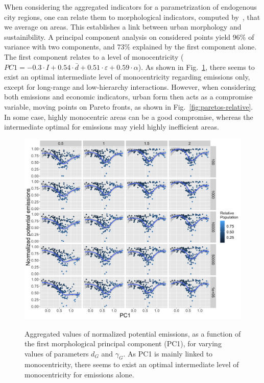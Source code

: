 \documentclass{jimis-en}
\begin{document}
When considering the aggregated indicators for a parametrization of endogenous city regions, one can relate them to morphological indicators, computed by~\cite{}, that we average on areas. This establishes a link between urban morphology and sustainibility. A principal component analysis on considered points yield 96\% of variance with two components, and 73\% explained by the first component alone. The first component relates to a level of monocentricity ($PC1 = -0.3\cdot I + 0.54 \cdot \bar{d} + 0.51\cdot \varepsilon + 0.59 \cdot \alpha$). As shown in Fig.~\ref{fig:emissions-pc1}, there seems to exist an optimal intermediate level of monocentricity regarding emissions only, except for long-range and low-hierarchy interactions. However, when considering both emissions and economic indicators, urban form then acts as a compromise variable, moving points on Pareto fronts, as shown in Fig.~\ref{fig:paretos-relative}. In some case, highly monocentric areas can be a good compromise, whereas the intermediate optimal for emissions may yield highly inefficient areas.



\begin{figure}[ht] 
  {\includegraphics[width=\linewidth]{figures/aggreg_morpho_pc1-emissions.png}}
  \centering
  \label{fig:emissions-pc1}
  \caption{Aggregated values of normalized potential emissions, as a function of the first morphological principal component (PC1), for varying values of parameters $d_G$ and $\gamma_G$. As PC1 is mainly linked to monocentricity, there seems to exist an optimal intermediate level of monocentricity for emissions alone.}
\end{figure}
\end{document}
